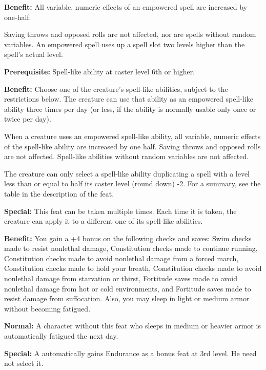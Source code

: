 
\textbf{Benefit:} All variable, numeric effects of an empowered spell are increased 
by one-half.

Saving throws and opposed rolls are not affected, nor are spells without random 
variables. An empowered spell uses up a spell slot two levels higher than the spell's 
actual level.


\textbf{Prerequisite:} Spell-like ability at caster level 6th or higher.

\textbf{Benefit:} Choose one of the creature's spell-like abilities, subject to 
the restrictions below. The creature can use that ability as an empowered spell-like 
ability three times per day (or less, if the ability is normally usable only once 
or twice per day).

When a creature uses an empowered spell-like ability, all variable, numeric effects 
of the spell-like ability are increased by one half. Saving throws and opposed 
rolls are not affected. Spell-like abilities without random variables are not affected.

The creature can only select a spell-like ability duplicating a spell with a level 
less than or equal to half its caster level (round down) -2. For a summary, see 
the table in the description of the  feat. 

\textbf{Special:} This feat can be taken multiple times. Each time it is taken, 
the creature can apply it to a different one of its spell-like abilities.


\textbf{Benefit:} You gain a +4 bonus on the following checks and saves: Swim checks 
made to resist nonlethal damage, Constitution checks made to continue running, 
Constitution checks made to avoid nonlethal damage from a forced march, Constitution 
checks made to hold your breath, Constitution checks made to avoid nonlethal damage 
from starvation or thirst, Fortitude saves made to avoid nonlethal damage from 
hot or cold environments, and Fortitude saves made to resist damage from suffocation. 
Also, you may sleep in light or medium armor without becoming fatigued.

\textbf{Normal:} A character without this feat who sleeps in medium or heavier 
armor is automatically fatigued the next day.

\textbf{Special:} A  automatically gains Endurance as a bonus feat at 3rd 
level. He need not select it.

